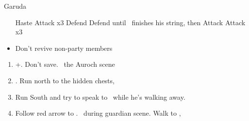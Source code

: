 \begin{battle}[1800]{Garuda}
	\begin{itemize}
		\tidusf Haste \auron
		\auronf Attack x3
		\wakkaf Defend
		\tidusf Defend until \auron\ finishes his string, then Attack
		\auronf Attack x3
		\item Don't revive non-\auron party members
	\end{itemize}
\end{battle}
\begin{enumerate}[resume]
	\item \cs+\skippablefmv[1:30]. Don't save. \sd\ the Auroch scene
	\item \cs[4:50]. Run north to the hidden chests, 
	\item Run South and try to speak to \auron\ while he's walking away.
	\item Follow red arrow to \yuna. \sd\ during guardian scene. Walk to \yuna, \cs[4:20]
\end{enumerate}